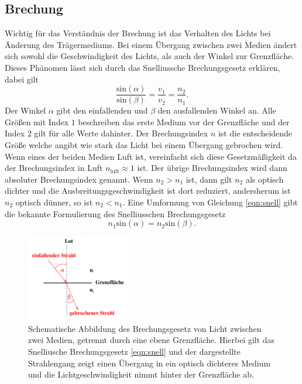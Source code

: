 \subsection{Brechung}
Wichtig für das Verständnis der Brechung ist das Verhalten des Lichts bei Änderung des Trägermediums. Bei einem Übergang zwischen zwei Medien ändert sich sowohl die Geschwindigkeit des Lichts, als auch der Winkel zur Grenzfläche.
Dieses Phänomen lässt sich durch das Snelliussche Brechungsgesetz erklären, dabei gilt \cite{skript}
\begin{equation}
    \label{eqn:snell}
    \frac{\text{sin}(\alpha)}{\text{sin} (\beta)} = \frac{v_1}{v_2} = \frac{n_2}{n_1}.
\end{equation}
Der Winkel $\alpha$ gibt den einfallenden und $\beta$ den ausfallenden Winkel an. Alle Größen mit Index $1$ beschreiben das erste Medium vor der Grenzfläche und der Index $2$ gilt für alle Werte dahinter. Der Brechungsindex $n$ ist die
entscheidende Größe welche angibt wie stark das Licht bei einem Übergang gebrochen wird. Wenn eines der beiden Medien Luft ist, vereinfacht sich diese Gesetzmäßigkeit da der Brechungsindex in Luft $n_{\text{luft}} \approx 1$ ist. Der übrige
Brechungsindex wird dann absoluter Brechungsindex genannt.
Wenn $n_2 > n_1$ ist, dann gilt $n_2$ als optisch dichter und die Ausbreitungsgeschwindigkeit ist dort reduziert, andersherum ist $n_2$ optisch dünner, so ist $n_2 < n_1$.
Eine Umformung von Gleichung \eqref{eqn:snell} gibt die bekannte Formulierung des Snelliusschen Brechungsgesetz \cite{skript}
\begin{equation*}
n_1 \text{sin}(\alpha) = n_2 \text{sin}(\beta).
\end{equation*}
\begin{figure}
    \centering
    \includegraphics[width=0.4\textwidth]{bilder/2.png}
    \caption{Schematische Abbildung des Brechungsgesetz von Licht zwischen zwei Medien, getrennt durch eine ebene Grenzfläche. Hierbei gilt das Snelliusche Brechungsgesetz \eqref{eqn:snell} und der dargestellte Strahlengang zeigt einen Übergang in ein optisch
    dichteres Medium und die Lichtgeschwindigkeit nimmt hinter der Grenzfläche ab.\cite{skript}}
    \label{fig:brechung}
\end{figure}

